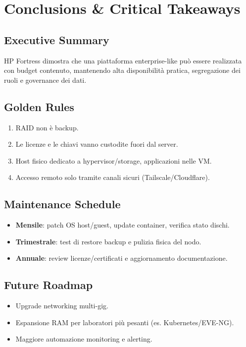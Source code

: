 \documentclass[11pt,a4paper]{article}
\begin{document}
\section{Conclusions \& Critical Takeaways}

\subsection{Executive Summary}
HP Fortress dimostra che una piattaforma enterprise-like può essere realizzata con budget contenuto, mantenendo alta disponibilità pratica, segregazione dei ruoli e governance dei dati.

\subsection{Golden Rules}
\begin{enumerate}
  \item RAID non è backup.
  \item Le licenze e le chiavi vanno custodite fuori dal server.
  \item Host fisico dedicato a hypervisor/storage, applicazioni nelle VM.
  \item Accesso remoto solo tramite canali sicuri (Tailscale/Cloudflare).
\end{enumerate}

\subsection{Maintenance Schedule}
\begin{itemize}
  \item \textbf{Mensile}: patch OS host/guest, update container, verifica stato dischi.
  \item \textbf{Trimestrale}: test di restore backup e pulizia fisica del nodo.
  \item \textbf{Annuale}: review licenze/certificati e aggiornamento documentazione.
\end{itemize}

\subsection{Future Roadmap}
\begin{itemize}
  \item Upgrade networking multi-gig.
  \item Espansione RAM per laboratori più pesanti (es. Kubernetes/EVE-NG).
  \item Maggiore automazione monitoring e alerting.
\end{itemize}
\end{document}

